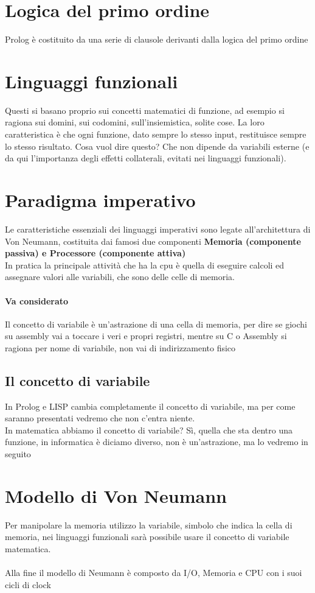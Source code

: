 \documentclass[12pt, a4paper, openany, oneside]{book}
\begin{document}
\section{Logica del primo ordine}
Prolog è costituito da una serie di clausole derivanti dalla logica del primo
ordine
\section{Linguaggi funzionali}
Questi si basano proprio sui concetti matematici di funzione, ad esempio si 
ragiona sui domini, sui codomini, sull'insiemistica, solite cose. La loro caratteristica
è che ogni funzione, dato sempre lo stesso input, restituisce sempre lo stesso
risultato. Cosa vuol dire questo? Che non dipende da variabili esterne (e da qui
l'importanza degli effetti collaterali, evitati nei linguaggi funzionali).
\section{Paradigma imperativo}
Le caratteristiche essenziali dei linguaggi imperativi sono legate all'architettura 
di Von Neumann, costituita dai famosi due componenti 
\textbf{Memoria (componente passiva) e Processore (componente attiva)}
\\
In pratica la principale attività che ha la cpu è quella di eseguire calcoli
ed assegnare valori alle variabili, che sono delle celle di memoria.
\paragraph{Va considerato}
Il concetto di variabile è un'astrazione di una cella di memoria, per dire 
se giochi su assembly vai a toccare i veri e propri registri, mentre su C o 
Assembly si ragiona per nome di variabile, non vai di indirizzamento fisico
\subsection{Il concetto di variabile}
In Prolog e LISP cambia completamente il concetto di variabile, ma per come 
saranno presentati vedremo che non c'entra niente. \\
In matematica abbiamo il concetto di variabile? Sì, quella che sta dentro una
funzione, in informatica è diciamo diverso, non è un'astrazione, ma lo vedremo
in seguito
\section{Modello di Von Neumann}
Per manipolare la memoria utilizzo la variabile, simbolo che indica la cella 
di memoria, nei linguaggi funzionali sarà possibile usare il concetto di 
variabile matematica. 
\\ \\
Alla fine il modello di Neumann è composto da I/O, Memoria e CPU con i suoi 
cicli di clock
\end{document}

